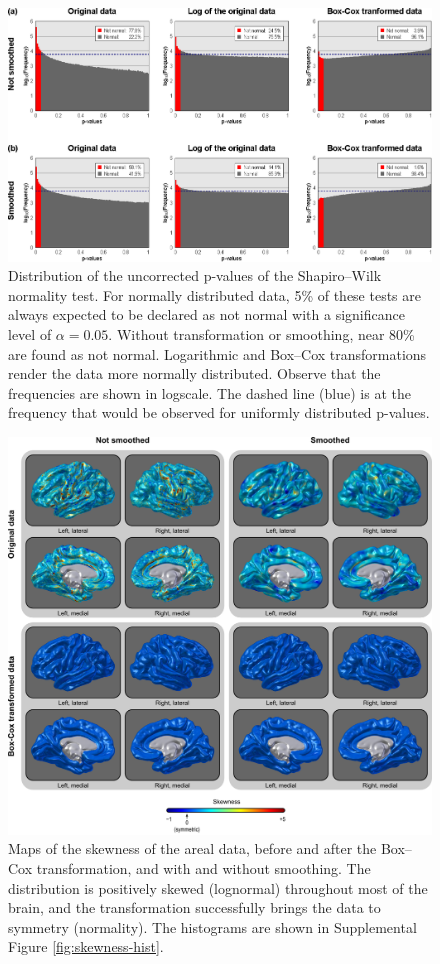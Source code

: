 \begin{figure}[!p]  %
\centering
\includegraphics[width=14cm]{images/histograms.eps}
\caption[Results of the Shapiro--Wilk normality test.]{Distribution of the uncorrected p-values of the Shapiro--Wilk normality test. For normally distributed data, 5\% of these tests are always expected to be declared as not normal with a significance level of $\alpha=0.05$. Without transformation or smoothing, near 80\% are found as not normal. Logarithmic and Box--Cox transformations render the data more normally distributed. Observe that the frequencies are shown in logscale. The dashed line (blue) is at the frequency that would be observed for uniformly distributed p-values.}
\label{fig:histograms}
\end{figure}

\begin{figure}[!p]  %
\centering
\includegraphics[width=14cm]{images/skewness.png}
\caption[Maps of the skewness of the areal data.]{Maps of the skewness of the areal data, before and after the Box--Cox transformation, and with and without smoothing. The distribution is positively skewed (lognormal) throughout most of the brain, and the transformation successfully brings the data to symmetry (normality). The histograms are shown in Supplemental Figure \ref{fig:skewness-hist}.}
\label{fig:skewness}
\end{figure}

